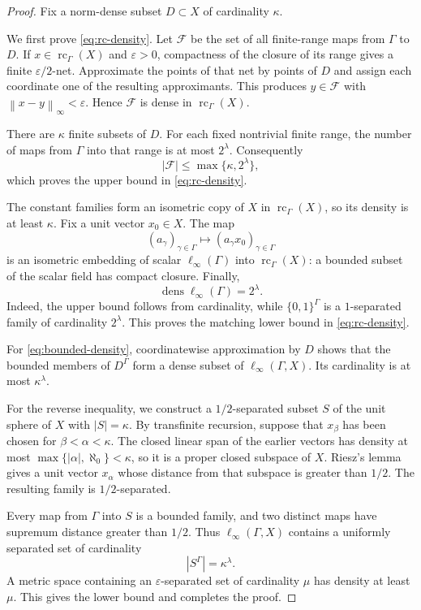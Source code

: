 \documentclass[11pt]{article}
\newcommand{\dens}{\operatorname{dens}}
\newcommand{\rc}{\operatorname{rc}}
\newcommand{\norm}[1]{\left\lVert #1\right\rVert}
\begin{document}
\begin{proof}
Fix a norm-dense subset \(D\subset X\) of cardinality \(\kappa\).

We first prove \eqref{eq:rc-density}. Let
\(\mathcal F\) be the set of all finite-range maps from \(\Gamma\) to \(D\).
If \(x\in\rc_\Gamma(X)\) and \(\varepsilon>0\), compactness of the closure of
its range gives a finite \(\varepsilon/2\)-net. Approximate the points of that
net by points of \(D\) and assign each coordinate one of the resulting
approximants. This produces \(y\in\mathcal F\) with
\(\norm{x-y}_\infty<\varepsilon\). Hence \(\mathcal F\) is dense in
\(\rc_\Gamma(X)\).

There are \(\kappa\) finite subsets of \(D\). For each fixed nontrivial finite
range, the number of maps from \(\Gamma\) into that range is at most
\(2^\lambda\). Consequently
\[
 |\mathcal F|\le\max\{\kappa,2^\lambda\},
\]
which proves the upper bound in \eqref{eq:rc-density}.

The constant families form an isometric copy of \(X\) in
\(\rc_\Gamma(X)\), so its density is at least \(\kappa\). Fix a unit vector
\(x_0\in X\). The map
\[
 (a_\gamma)_{\gamma\in\Gamma}
 \longmapsto
 (a_\gamma x_0)_{\gamma\in\Gamma}
\]
is an isometric embedding of scalar \(\ell_\infty(\Gamma)\) into
\(\rc_\Gamma(X)\): a bounded subset of the scalar field has compact closure.
Finally,
\[
 \dens\ell_\infty(\Gamma)=2^\lambda.
\]
Indeed, the upper bound follows from cardinality, while
\(\{0,1\}^{\Gamma}\) is a \(1\)-separated family of cardinality
\(2^\lambda\). This proves the matching lower bound in
\eqref{eq:rc-density}.

For \eqref{eq:bounded-density}, coordinatewise approximation by \(D\) shows
that the bounded members of \(D^\Gamma\) form a dense subset of
\(\ell_\infty(\Gamma,X)\). Its cardinality is at most \(\kappa^\lambda\).

For the reverse inequality, we construct a \(1/2\)-separated subset
\(S\) of the unit sphere of \(X\) with \(|S|=\kappa\). By transfinite
recursion, suppose that \(x_\beta\) has been chosen for \(\beta<\alpha<\kappa\).
The closed linear span of the earlier vectors has density at most
\(\max\{|\alpha|,\aleph_0\}<\kappa\), so it is a proper closed subspace of
\(X\). Riesz's lemma gives a unit vector \(x_\alpha\) whose distance from
that subspace is greater than \(1/2\). The resulting family is
\(1/2\)-separated.

Every map from \(\Gamma\) into \(S\) is a bounded family, and two distinct
maps have supremum distance greater than \(1/2\). Thus
\(\ell_\infty(\Gamma,X)\) contains a uniformly separated set of cardinality
\[
 |S^\Gamma|=\kappa^\lambda.
\]
A metric space containing an \(\varepsilon\)-separated set of cardinality
\(\mu\) has density at least \(\mu\). This gives the lower bound and
completes the proof.
\end{proof}
\end{document}

